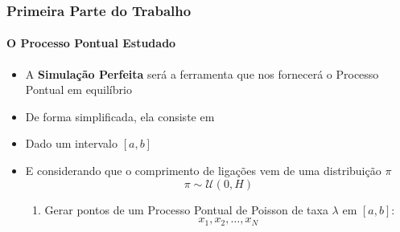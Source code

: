 \documentclass[11pt]{beamer}
\theoremstyle{remark}
\theoremstyle{definition}
\theoremstyle{plain}
\begin{document}
    \begin{frame}
        \frametitle{Primeira Parte do Trabalho}
        \framesubtitle{O Processo Pontual Estudado}

        \begin{itemize}
            \item
                A \textbf{Simulação Perfeita} será a ferramenta que nos
                fornecerá o Processo Pontual em equilíbrio

            \item
                De forma simplificada, ela consiste em

            \item
                Dado um intervalo $[a,b]$

            \item
                E considerando que o comprimento de ligações
                vem de uma distribuição $\pi$
                \begin{equation*}
                    \pi \sim \mathcal{U}(0, H)
                \end{equation*}

                \begin{enumerate}

                    \item
                        Gerar pontos de um Processo Pontual de Poisson de
                        taxa $\lambda$ em $[a,b]$:
                        \begin{equation*}
                            x_1, x_2, \ldots, x_N
                        \end{equation*}

                \end{enumerate}

        \end{itemize}
    \end{frame}
\end{document}
